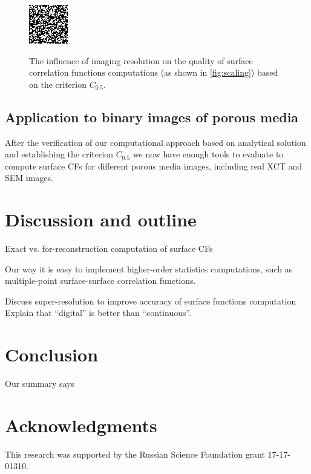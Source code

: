 \documentclass[reprint,amsmath,amssymb,aps,pre]{revtex4-1}
\begin{document}
\begin{figure}[t]
{    \includegraphics[width=0.475\linewidth]{images/disks-0015-5e-5-64.png}
    \label{fig:disks-64}}
  \caption[]{The influence of imaging resolution on the quality of surface
    correlation functions computations (as shown in \cref{fig:scaling}) based on
    the criterion $C_{0.5}$.}
  \label{fig:disks-res}
\end{figure}

\subsection{Application to binary images of porous media}
After the verification of our computational approach based on analytical
solution and establishing the criterion $C_{0.5}$ we now have enough tools to
evaluate to compute surface CFs for different porous media images, including
real XCT and SEM images.

\section{Discussion and outline}
Exact vs. for-reconstruction computation of surface CFs

Our way it is easy to implement higher-order statistics computations, such as
multiple-point surface-surface correlation functions.

Discuss super-resolution to improve accuracy of surface functions computation
Explain that ``digital'' is better than ``continuous''.

\section{Conclusion}
Our summary says

\section{Acknowledgments}
This research was supported by the Russian Science Foundation grant
17-17-01310.
\end{document}
